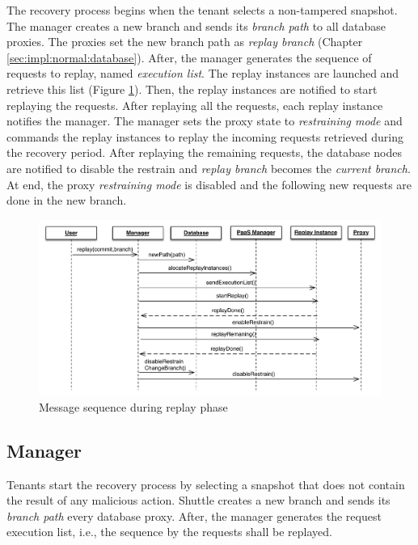 The recovery process begins when the tenant selects a non-tampered snapshot. The manager creates a new branch and sends its \emph{branch path} to all database proxies. The proxies set the new branch path as \emph{replay branch} (Chapter \ref{sec:impl:normal:database}). After, the manager generates the sequence of requests to replay, named \emph{execution list}. The replay instances are launched and retrieve this list (Figure \ref{fig:messaging_replay}). Then, the replay instances are notified to start replaying the requests. After replaying all the requests, each replay instance notifies the manager. The manager sets the proxy state to \emph{restraining mode} and commands the replay instances to replay the incoming requests retrieved during the recovery period. After replaying the remaining requests, the database nodes are notified to disable the restrain and \emph{replay branch} becomes the \emph{current branch}. At end, the proxy \emph{restraining mode} is disabled and the following new requests are done in the new branch.

\begin{figure}
  \centering
  \includegraphics[width=140mm]{images/message_replay}
  \caption{Message sequence during replay phase}
  \label{fig:messaging_replay}
\end{figure}


\subsection{Manager}\label{sec:impl:recovery:manager}
Tenants start the recovery process by selecting a snapshot that does not contain the result of any malicious action. Shuttle creates a new branch and sends its \emph{branch path} every database proxy. After, the manager generates the request execution list, i.e., the sequence by the requests shall be replayed.

